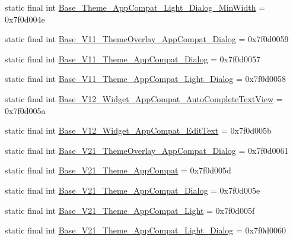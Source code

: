 \begin{DoxyCompactItemize}
static final int \mbox{\hyperlink{classandroid_1_1support_1_1v7_1_1appcompat_1_1R_1_1style_add0b859f850814a0f0994f7da25148df}{Base\+\_\+\+Theme\+\_\+\+App\+Compat\+\_\+\+Light\+\_\+\+Dialog\+\_\+\+Min\+Width}} = 0x7f0d004e
\item 
static final int \mbox{\hyperlink{classandroid_1_1support_1_1v7_1_1appcompat_1_1R_1_1style_a3f5b9741da2b0e432baa3a72bd3bf5d7}{Base\+\_\+\+V11\+\_\+\+Theme\+Overlay\+\_\+\+App\+Compat\+\_\+\+Dialog}} = 0x7f0d0059
\item 
static final int \mbox{\hyperlink{classandroid_1_1support_1_1v7_1_1appcompat_1_1R_1_1style_a8c7529baff896f21e19183dbd4ca22db}{Base\+\_\+\+V11\+\_\+\+Theme\+\_\+\+App\+Compat\+\_\+\+Dialog}} = 0x7f0d0057
\item 
static final int \mbox{\hyperlink{classandroid_1_1support_1_1v7_1_1appcompat_1_1R_1_1style_ae47b7ad929a64384840f0bbd2e88d5ee}{Base\+\_\+\+V11\+\_\+\+Theme\+\_\+\+App\+Compat\+\_\+\+Light\+\_\+\+Dialog}} = 0x7f0d0058
\item 
static final int \mbox{\hyperlink{classandroid_1_1support_1_1v7_1_1appcompat_1_1R_1_1style_a682c0f421ce2001f69e38cfda1f240ac}{Base\+\_\+\+V12\+\_\+\+Widget\+\_\+\+App\+Compat\+\_\+\+Auto\+Complete\+Text\+View}} = 0x7f0d005a
\item 
static final int \mbox{\hyperlink{classandroid_1_1support_1_1v7_1_1appcompat_1_1R_1_1style_ab40953d122f2cd8de7a74f8c39fea2e0}{Base\+\_\+\+V12\+\_\+\+Widget\+\_\+\+App\+Compat\+\_\+\+Edit\+Text}} = 0x7f0d005b
\item 
static final int \mbox{\hyperlink{classandroid_1_1support_1_1v7_1_1appcompat_1_1R_1_1style_ac44aa9e49ece31bada22eeac8667d8ea}{Base\+\_\+\+V21\+\_\+\+Theme\+Overlay\+\_\+\+App\+Compat\+\_\+\+Dialog}} = 0x7f0d0061
\item 
static final int \mbox{\hyperlink{classandroid_1_1support_1_1v7_1_1appcompat_1_1R_1_1style_a8cb8846ccd9a78ed3b5c7cfff9c64b53}{Base\+\_\+\+V21\+\_\+\+Theme\+\_\+\+App\+Compat}} = 0x7f0d005d
\item 
static final int \mbox{\hyperlink{classandroid_1_1support_1_1v7_1_1appcompat_1_1R_1_1style_af12a4babdfe3ab610b0d241598adcf1d}{Base\+\_\+\+V21\+\_\+\+Theme\+\_\+\+App\+Compat\+\_\+\+Dialog}} = 0x7f0d005e
\item 
static final int \mbox{\hyperlink{classandroid_1_1support_1_1v7_1_1appcompat_1_1R_1_1style_a4376f811c6c223511a27dd5c2729e9e0}{Base\+\_\+\+V21\+\_\+\+Theme\+\_\+\+App\+Compat\+\_\+\+Light}} = 0x7f0d005f
\item 
static final int \mbox{\hyperlink{classandroid_1_1support_1_1v7_1_1appcompat_1_1R_1_1style_aeb190b7df390f0ef6a3f546f6218e70c}{Base\+\_\+\+V21\+\_\+\+Theme\+\_\+\+App\+Compat\+\_\+\+Light\+\_\+\+Dialog}} = 0x7f0d0060

\end{DoxyCompactItemize}
